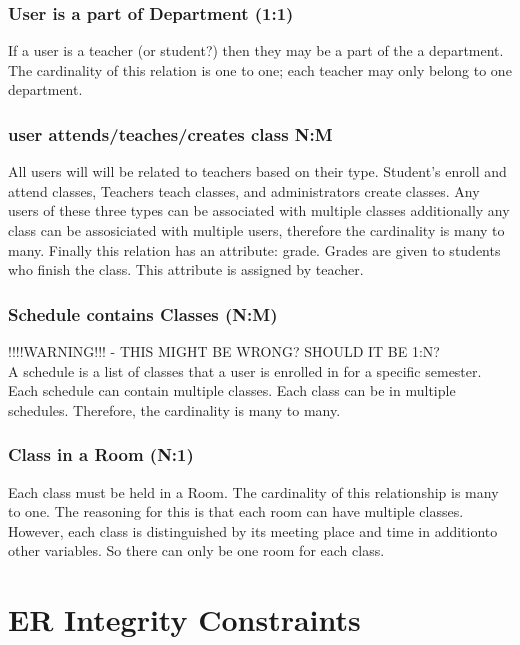 \documentclass[11pt,oneside,a4paper]{article}
\begin{document}
\subsubsection{User is a part of Department (1:1)}
If a user is a teacher (or student?) then they may be a part of the a department.
 The cardinality of this relation is one to one; each teacher may only belong to 
one department.
\subsubsection{user attends/teaches/creates class N:M}
All users will will be related to teachers based on their type.  Student's enroll and 
attend classes, Teachers teach classes, and administrators create classes.  Any users 
of these three types can be associated with multiple classes additionally any class 
can be assosiciated with multiple users, therefore the cardinality is many to many. 
Finally this relation has an attribute: grade.  Grades are given to students who 
finish the class. This attribute is assigned by teacher.
\subsubsection{Schedule contains Classes (N:M)}
!!!!WARNING!!! - THIS MIGHT BE WRONG? SHOULD IT BE 1:N?
\\
A schedule is a list of classes that a user is enrolled in for a specific semester.  Each schedule can contain multiple classes.  Each class can be in multiple schedules. Therefore, the cardinality is many to many. 
\subsubsection{Class in a Room (N:1)}
Each class must be held in a Room.  The cardinality of this relationship is many to one.  The reasoning for this is that each room can have multiple classes. However, each class is distinguished by its meeting place and time in additionto other variables.  So there can only be one room for each class. 
\section{ER Integrity Constraints}
\end{document}
